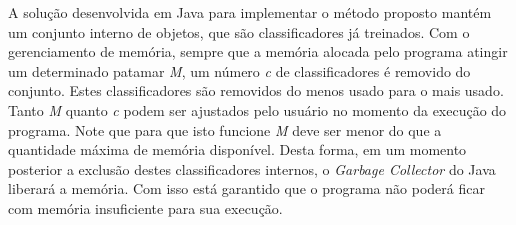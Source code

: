 A solução desenvolvida em Java para implementar o método proposto mantém um conjunto interno de objetos, que são classificadores já treinados. Com o gerenciamento de memória, sempre que a memória alocada pelo programa atingir um determinado patamar \textit{M}, um número \textit{c} de classificadores é removido do conjunto. Estes classificadores são removidos do menos usado para o mais usado. Tanto \textit{M} quanto \textit{c} podem ser ajustados pelo usuário no momento da execução do programa. Note que para que isto funcione \textit{M} deve ser menor do que a quantidade máxima de memória disponível. Desta forma, em um momento posterior a exclusão destes classificadores internos, o \textit{Garbage Collector} do Java liberará a memória. Com isso está garantido que o programa não poderá ficar com memória insuficiente para sua execução.
